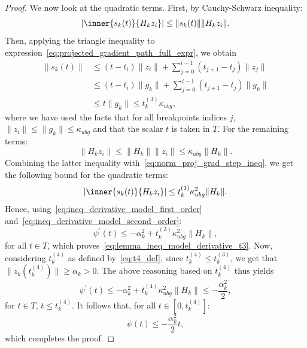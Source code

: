 \begin{proof}
	We now look at the quadratic terms. First, by Cauchy-Schwarz inequality:
	\begin{equation*}
		\left|\inner{s_k(t)}{H_kz_i}\right| \le \|s_k(t)\| \|H_kz_i\|.
	\end{equation*}
	Then, applying the triangle inequality to expression~\eqref{eq:projected_gradient_path_full_expr}, we obtain
	\begin{equation}\label{eq:norm_proj_grad_step_ineq}
		\begin{split}
			\|s_k(t)\| & \le (t-t_i) \|z_i\| + \sum_{j=0}^{i-1} (t_{j+1}-t_j)\|z_j\| \\
			& \le (t-t_i) \|g_k\| + \sum_{j=0}^{i-1} (t_{j+1}-t_j)\|g_k\| \\
			& \le t\|g_k\| \le t_k^{(3)}\kappa_{ubg},
		\end{split}
	\end{equation}
	where we have used the facts that for all breakpoints indices $j$, $\|z_i\| \le \|g_k\| \le \kappa_{ubg}$ and that the scalar $t$ is taken in $T$. For the remaining terms:
	\begin{equation*}
		\|H_kz_i\| \le \|H_k\| \|z_i\| \le \kappa_{ubg}\|H_k\|.
	\end{equation*}
	Combining the latter inequality with~\eqref{eq:norm_proj_grad_step_ineq}, we get the following bound for the quadratic terms:
	\begin{equation}\label{eq:ineq_derivative_model_second_order}
		\left|\inner{s_k(t)}{H_kz_i}\right| \le t_k^{(3)} \kappa_{ubg}^2 \|H_k\|.
	\end{equation}
	Hence, using~\eqref{eq:ineq_derivative_model_first_order} and~\eqref{eq:ineq_derivative_model_second_order}:
	\begin{equation*}
		\psi^\prime(t) \le -\alpha_k^2 + t_k^{(3)} \kappa_{ubg}^2 \|H_k\|,
	\end{equation*}
	for all $t \in T$, which proves~\eqref{eq:lemma_ineq_model_derivative_t3}.
	Now, considering $t_k^{(4)}$ as defined by~\eqref{eq:t4_def}, since $t_k^{(4)} \le t_k^{(3)}$, we get that $\|z_k(t_k^{(4)})\| \ge \alpha_k > 0$. The above reasoning based on $t_k^{(4)}$ thus yields
	\begin{equation*}
		\psi^\prime(t) \le -\alpha_k^2 + t_k^{(4)} \kappa_{ubg}^2 \|H_k\| \le -\dfrac{\alpha_k^2}{2},
	\end{equation*}
	for $t\in T$, $t\le t_k^{(4)}$. It follows that, for all $t\in [0,t_k^{(4)}]$:
	\begin{equation*}
		\psi(t) \le -\dfrac{\alpha_k^2}{2}t,
	\end{equation*}
	which completes the proof.
\end{proof}

